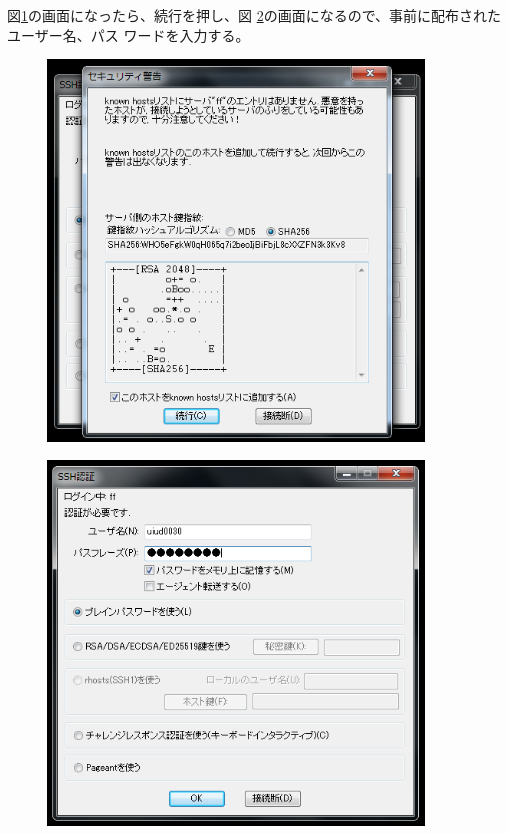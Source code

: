 \documentclass[12pt,a4paper,dvipdfmx]{jarticle}
\begin{document}
図\ref{fig:teraterm6}の画面になったら、続行を押し、図
\ref{fig:teraterm7}の画面になるので、事前に配布されたユーザー名、パス
ワードを入力する。

\begin{figure}
  \begin{center}
    \includegraphics[clip, width=10.0cm]{./fig/teraterm6_.png}
  \end{center}
  \caption{}
  \label{fig:teraterm6}
\end{figure}

\begin{figure}
  \begin{center}
    \includegraphics[clip, width=10.0cm]{./fig/teraterm7_.png}
  \end{center}
  \caption{}
  \label{fig:teraterm7}
\end{figure}
\end{document}
